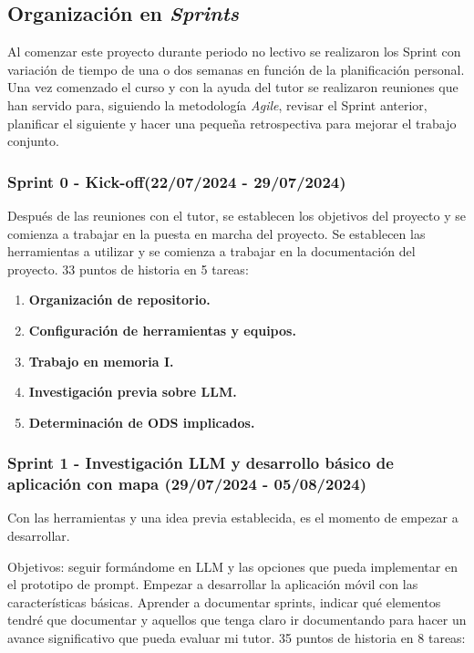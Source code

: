 \subsection{Organización en \textit{Sprints}}

Al comenzar este proyecto durante periodo no lectivo se realizaron los Sprint con variación de tiempo de una o dos semanas en función de la planificación personal. Una vez comenzado el curso y con la ayuda del tutor se realizaron reuniones que han servido para, siguiendo la metodología \textit{Agile}, revisar el Sprint anterior, planificar el siguiente y hacer una pequeña retrospectiva para mejorar el trabajo conjunto.


\subsubsection{Sprint 0 - Kick-off(22/07/2024 - 29/07/2024)}
Después de las reuniones con el tutor, se establecen los objetivos del proyecto y se comienza a trabajar en la puesta en marcha del proyecto. Se establecen las herramientas a utilizar y se comienza a trabajar en la documentación del proyecto. 33 puntos de historia en 5 tareas:
    \begin{enumerate}
    	\item \textbf{Organización de repositorio.}
    	\item \textbf{Configuración de herramientas y equipos.}
    	\item \textbf{Trabajo en memoria I.}
    	\item \textbf{Investigación previa sobre LLM.}
    	\item \textbf{Determinación de ODS implicados.}
    \end{enumerate}



\subsubsection{Sprint 1 - Investigación LLM y desarrollo básico de aplicación con mapa (29/07/2024 - 05/08/2024)} 
Con las herramientas y una idea previa establecida, es el momento de empezar a desarrollar.

    Objetivos: seguir formándome en LLM y las opciones que pueda implementar en el prototipo de prompt.
    Empezar a desarrollar la aplicación móvil con las características básicas.
    Aprender a documentar sprints, indicar qué elementos tendré que documentar y aquellos que tenga claro ir documentando para hacer un avance significativo que pueda evaluar mi tutor. 35 puntos de historia en 8 tareas:

